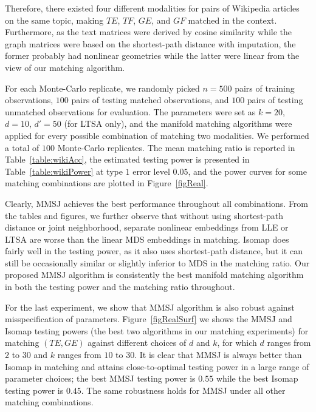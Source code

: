 \documentclass[times,twocolumn,final]{elsarticle}
\begin{document}
Therefore, there existed four different modalities for pairs of Wikipedia articles on the same topic, making $TE$, $TF$, $GE$, and $GF$ matched in the context. Furthermore, as the text matrices were derived by cosine similarity while the graph matrices were based on the shortest-path distance with imputation, the former probably had nonlinear geometries while the latter were linear from the view of our matching algorithm.

For each Monte-Carlo replicate, we randomly picked $n=500$ pairs of training observations, $100$ pairs of testing matched observations, and $100$ pairs of testing unmatched observations for evaluation. The parameters were set as $k=20$, $d=10$, $d'=50$ (for LTSA only), and the manifold matching algorithms were applied for every possible combination of matching two modalities. We performed a total of $100$ Monte-Carlo replicates. The mean matching ratio is reported in Table~\ref{table:wikiAcc}, the estimated testing power is presented in Table~\ref{table:wikiPower} at type $1$ error level $0.05$, and the power curves for some matching combinations are plotted in Figure~\ref{figReal}. 

Clearly, MMSJ achieves the best performance throughout all combinations. From the tables and figures, we further observe that without using shortest-path distance or joint neighborhood, separate nonlinear embeddings from LLE or LTSA are worse than the linear MDS embeddings in matching. Isomap does fairly well in the testing power, as it also uses shortest-path distance, but it can still be occasionally similar or slightly inferior to MDS in the matching ratio. Our proposed MMSJ algorithm is consistently the best manifold matching algorithm in both the testing power and the matching ratio throughout.

For the last experiment, we show that MMSJ algorithm is also robust against misspecification of parameters. Figure~\ref{figRealSurf} we shows the MMSJ and Isomap testing powers (the best two algorithms in our matching experiments) for matching $(TE,GE)$ against different choices of $d$ and $k$, for which $d$ ranges from $2$ to $30$ and $k$ ranges from $10$ to $30$. It is clear that MMSJ is always better than Isomap in matching and attains close-to-optimal testing power in a large range of parameter choices; the best MMSJ testing power is $0.55$ while the best Isomap testing power is $0.45$. The same robustness holds for MMSJ under all other matching combinations. 

\end{document}
